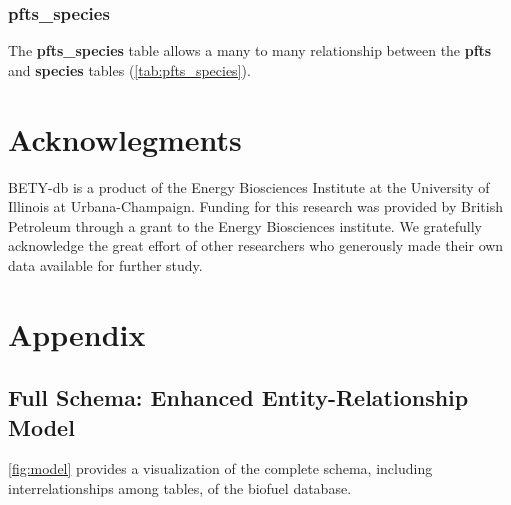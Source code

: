 \documentclass[10pt]{article}
\begin{document}
\subsubsection{pfts\_species}

The \textbf{pfts\_species} table allows a many to many relationship between the \textbf{pfts} and \textbf{species} tables (\autoref{tab:pfts_species}).

\section{Acknowlegments}
 BETY-db is a product of the Energy Biosciences Institute at the University of Illinois at Urbana-Champaign. 
 Funding for this research was provided by British Petroleum through a grant to the  Energy Biosciences institute.
 We gratefully acknowledge the great effort of other researchers who generously made their own data available for further study.
\newpage
\section{Appendix}

\subsection{Full Schema: Enhanced Entity-Relationship Model}%
\autoref{fig:model} provides a visualization of the complete schema, including interrelationships among tables, of the biofuel database. 
\end{document}
